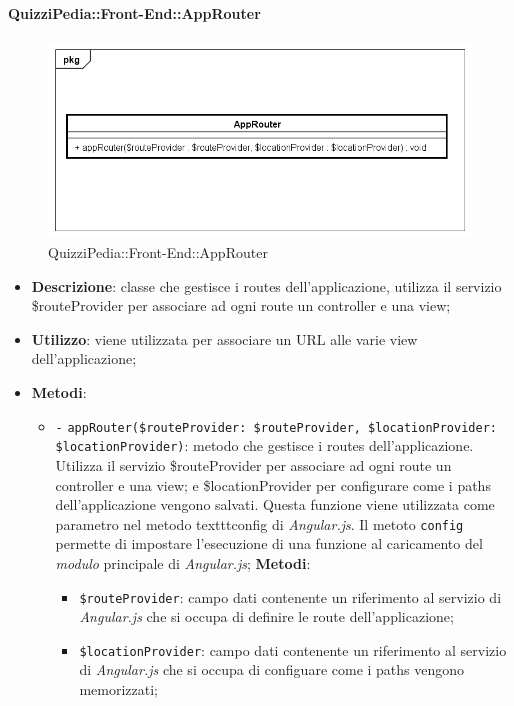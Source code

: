	\paragraph{QuizziPedia::Front-End::AppRouter}
	
	\label{QuizziPedia::Front-End::AppRouter}
	
	\begin{figure}[ht]
		\centering
		\includegraphics[scale=0.5,keepaspectratio]{UML/Classi/Front-End/QuizziPedia_Front-end_AppRouter.png}
		\caption{QuizziPedia::Front-End::AppRouter}
	\end{figure} \FloatBarrier
	
	\begin{itemize}
		\item \textbf{Descrizione}: classe che gestisce i routes dell’applicazione, utilizza il servizio \$routeProvider per associare ad ogni route un controller e una view;
		\item \textbf{Utilizzo}: viene utilizzata per associare un URL alle varie view dell’applicazione;
		\item \textbf{Metodi}: 
		\begin{itemize}
			\item \texttt{-} \texttt{appRouter(\$routeProvider: \$routeProvider, \$locationProvider: \$locationProvider)}: metodo che gestisce i routes dell’applicazione. Utilizza il servizio \$routeProvider per associare ad ogni route un controller e una view; e \$locationProvider per configurare come i paths dell'applicazione vengono salvati. Questa funzione viene utilizzata come parametro nel metodo texttt{config} di \textit{Angular.js}. Il metoto \texttt{config} permette di impostare l'esecuzione di una funzione al caricamento del \textit{modulo} principale di \textit{Angular.js};
			\textbf{Metodi}:
			\begin{itemize}
				\item \texttt{\$routeProvider}: campo dati contenente un riferimento al servizio di \textit{Angular.js} che si occupa di definire le route dell’applicazione;
				\item \texttt{\$locationProvider}: campo dati contenente un riferimento al servizio di \textit{Angular.js} che si occupa di configuare come i paths vengono memorizzati;
			\end{itemize}
		\end{itemize}
	\end{itemize}
	
